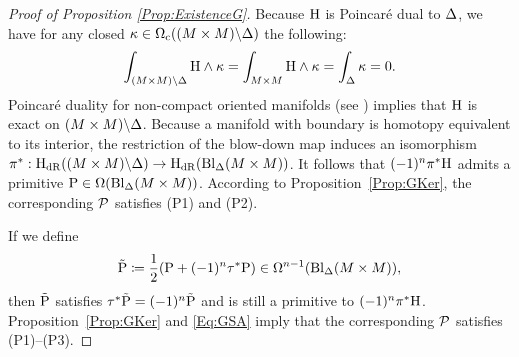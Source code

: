 \documentclass[\MainFolder/Text.tex]{subfiles}
\begin{document}
\begin{proof}[Proof of Proposition \ref{Prop:ExistenceG}]
Because $\mathrm{H}$ is Poincar\'e dual to $\Delta$, we have for any closed $\kappa \in \Omega_{\mathrm{c}}((M\times M)\backslash \Delta)$ the following:
$$ \int_{(M\times M)\backslash \Delta} \mathrm{H} \wedge \kappa = \int_{M\times M} \mathrm{H} \wedge \kappa = \int_{\Delta} \kappa = 0. $$
Poincar\'e duality for non-compact oriented manifolds (see \cite{BottTu1982}) implies that $\mathrm{H}$ is exact on $(M\times M)\backslash \Delta$. Because a manifold with boundary is homotopy equivalent to its interior,  the restriction of the blow-down map induces an isomorphism $\pi^* : \mathrm{H}_{\mathrm{dR}}((M\times M)\backslash \Delta) \rightarrow \mathrm{H}_{\mathrm{dR}}(\mathrm{Bl}_{\Delta}(M\times M))$. It follows that $(-1)^n \pi^* \mathrm{H}$ admits a primitive $\mathrm{P} \in \Omega(\mathrm{Bl}_{\Delta}(M\times M))$. According to Proposition~\ref{Prop:GKer}, the corresponding $\mathcal{P}$ satisfies (P1) and (P2).

If we define
$$ \tilde{\mathrm{P}} \coloneqq \frac{1}{2}(\mathrm{P} + (-1)^n \tau^* \mathrm{P})\in \Omega^{n-1}(\mathrm{Bl}_{\Delta}(M\times M)), $$
then $\tilde{\mathrm{P}}$ satisfies $\tau^* \tilde{\mathrm{P}} = (-1)^n \tilde{\mathrm{P}}$ and is still a primitive to $(-1)^n \pi^* \mathrm{H}$. Proposition~\ref{Prop:GKer} and \eqref{Eq:GSA} imply that the corresponding $\mathcal{P}$ satisfies (P1)--(P3).


\end{proof}
\end{document}
